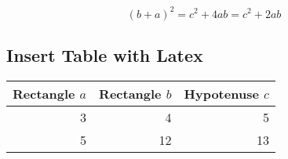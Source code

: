 \documentclass[11pt]{article}
\begin{document}
\begin{equation}
(b + a) ^2 = c^2 + 4ab = c^2 + 2ab
\end{equation}

\subsection{Insert Table with Latex}

\begin{tabular}{|rrr|}
\hline
Rectangle $a$ & Rectangle $b$ & Hypotenuse $c$ \\
\hline
    3         & 4             & 5              \\
    5         & 12            & 13             \\
\hline
\end{tabular}


\end{document}
